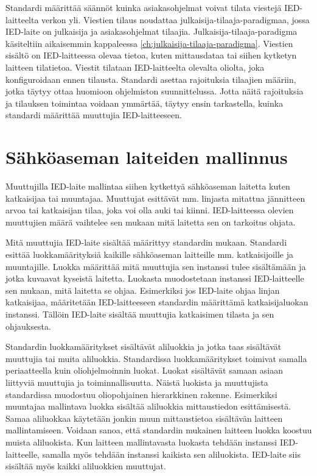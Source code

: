 Standardi määrittää säännöt kuinka asiakasohjelmat voivat tilata viestejä IED-laitteelta verkon yli. Viestien tilaus noudattaa julkaisija-tilaaja-paradigmaa, jossa IED-laite on julkaisija ja asiakasohjelmat tilaajia. Julkaisija-tilaaja-paradigma käsiteltiin aikaisemmin kappaleessa \ref{ch:julkaisija-tilaaja-paradigma}. Viestien sisältö on IED-laitteessa olevaa tietoa, kuten mittausdataa tai siihen kytketyn laitteen tilatietoa. Viestit tilataan IED-laitteelta olevalta oliolta, joka konfiguroidaan ennen tilausta. Standardi asettaa rajoituksia tilaajien määriin, jotka täytyy ottaa huomioon ohjelmiston suunnittelussa. Jotta näitä rajoituksia ja tilauksen toimintaa voidaan ymmärtää, täytyy ensin tarkastella, kuinka standardi määrittää muuttujia IED-laitteeseen. \mbox{\cite[s.~91--97]{IEC61850-7-2}}


\section{Sähköaseman laiteiden mallinnus}
Muuttujilla IED-laite mallintaa siihen kytkettyä sähköaseman laitetta kuten katkaisijaa tai muuntajaa. Muuttujat esittävät mm. linjasta mitattua jännitteen arvoa tai katkaisijan tilaa, joka voi olla auki tai kiinni. IED-laitteessa olevien muuttujien määrä vaihtelee sen mukaan mitä laitetta sen on tarkoitus ohjata. \cite[s.~28]{IEC61850-7-1}

Mitä muuttujia IED-laite sisältää määrittyy standardin mukaan. Standardi esittää luokkamäärityksiä kaikille sähköaseman laitteille mm. katkaisijoille ja muuntajille. Luokka määrittää mitä muuttujia sen instanssi tulee sisältämään ja jotka kuvaavat kyseistä laitetta. Luokasta muodostetaan instanssi IED-laitteelle sen mukaan, mitä laitetta se ohjaa. Esimerkiksi jos IED-laite ohjaa linjan katkaisijaa, määritetään IED-laitteeseen standardin määrittämä katkaisijaluokan instanssi. Tällöin IED-laite sisältää muuttujia katkaisimen tilasta ja sen ohjauksesta. \cite{IEC61850-7-3, IEC61850-7-4}

Standardin luokkamääritykset sisältävät aliluokkia ja jotka taas sisältävät muuttujia tai muita aliluokkia. Standardissa luokkamääritykset toimivat samalla periaatteella kuin oliohjelmoinnin luokat. Luokat sisältävät samaan asiaan liittyviä muuttujia ja toiminnallisuutta. Näistä luokista ja muuttujista standardissa muodostuu oliopohjainen hierarkkinen rakenne. Esimerkiksi muuntajaa mallintava luokka sisältää aliluokkia mittaustiedon esittämisestä. Samaa aliluokkaa käytetään jonkin muun mittaustietoa sisältävän laitteen mallintamiseen. Voidaan sanoa, että standardin mukainen laitteen luokka koostuu muista aliluokista. Kun laitteen mallintavasta luokasta tehdään instanssi IED-laitteelle, samalla myös tehdään instanssi kaikista sen aliluokista. IED-laite siis sisältää myös kaikki aliluokkien muuttujat. \mbox{\cite[s.~108]{IEC61850-7-1}}


